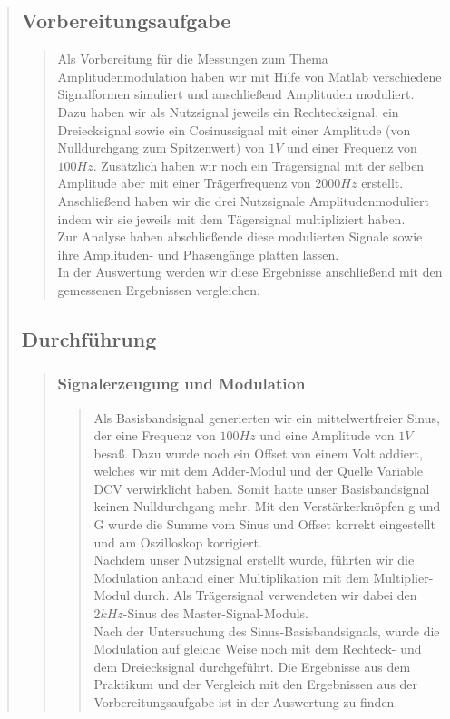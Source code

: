 \begin{quote}
    \subsection{Vorbereitungsaufgabe}
    \begin{quote}
        Als Vorbereitung für die Messungen zum Thema Amplitudenmodulation haben wir mit Hilfe von Matlab verschiedene
        Signalformen simuliert und anschließend Amplituden moduliert.\\
        Dazu haben wir als Nutzsignal jeweils ein Rechtecksignal, ein Dreiecksignal sowie ein Cosinussignal mit
        einer Amplitude (von Nulldurchgang zum Spitzenwert) von $1V$ und einer Frequenz von $100 Hz$. Zusätzlich haben
        wir noch ein Trägersignal mit der selben Amplitude aber mit einer Trägerfrequenz von $2000 Hz$ erstellt.\\
        Anschließend haben wir die drei Nutzsignale Amplitudenmoduliert indem wir sie jeweils mit dem Tägersignal
        multipliziert haben.\\
        Zur Analyse haben abschließende diese modulierten Signale sowie ihre Amplituden- und Phasengänge platten
        lassen.\\
        In der Auswertung werden wir diese Ergebnisse anschließend mit den gemessenen Ergebnissen vergleichen.
    \end{quote}
    
    \subsection{Durchführung}
    \begin{quote}
    	\subsubsection{Signalerzeugung und Modulation}
    	\begin{quote}
    	Als Basisbandsignal generierten wir ein mittelwertfreier Sinus,
    	der eine Frequenz von $100 Hz$ und eine Amplitude von $1 V$ besaß. Dazu wurde noch
    	ein Offset von einem Volt addiert, welches wir mit dem Adder-Modul und der
    	Quelle Variable DCV verwirklicht haben. Somit hatte unser Basisbandsignal
    	keinen Nulldurchgang mehr. Mit den Verstärkerknöpfen g und G wurde die
    	Summe vom Sinus und Offset korrekt eingestellt und am Oszilloskop
    	korrigiert.\\
    	Nachdem unser Nutzsignal erstellt wurde, führten wir die Modulation anhand
    	einer Multiplikation mit dem Multiplier-Modul durch. Als Trägersignal
    	verwendeten wir dabei den $2kHz$-Sinus des Master-Signal-Moduls.\\
    	Nach der Untersuchung des Sinus-Basisbandsignals, wurde die Modulation auf
    	gleiche Weise noch mit dem Rechteck- und dem Dreiecksignal durchgeführt.
    	Die Ergebnisse aus dem Praktikum und der Vergleich mit den Ergebnissen aus
    	der Vorbereitungsaufgabe ist in der Auswertung zu finden.
    	\end{quote}
    	

\end{quote}
\end{quote}
